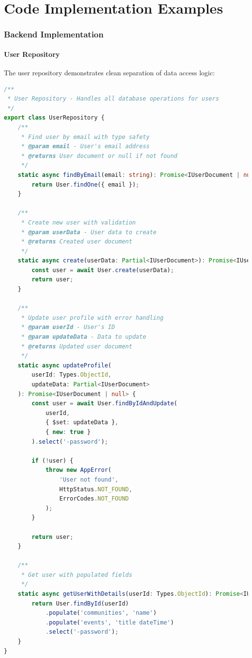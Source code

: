 \section{Code Implementation Examples}
\label{subsec:code_examples}

\subsubsection{Backend Implementation}
\label{subsubsec:backend_examples}

\paragraph{User Repository}
The user repository demonstrates clean separation of data access logic:

\begin{lstlisting}[language=TypeScript, caption={User Repository Implementation}]
/**
 * User Repository - Handles all database operations for users
 */
export class UserRepository {
    /**
     * Find user by email with type safety
     * @param email - User's email address
     * @returns User document or null if not found
     */
    static async findByEmail(email: string): Promise<IUserDocument | null> {
        return User.findOne({ email });
    }

    /**
     * Create new user with validation
     * @param userData - User data to create
     * @returns Created user document
     */
    static async create(userData: Partial<IUserDocument>): Promise<IUserDocument> {
        const user = await User.create(userData);
        return user;
    }

    /**
     * Update user profile with error handling
     * @param userId - User's ID
     * @param updateData - Data to update
     * @returns Updated user document
     */
    static async updateProfile(
        userId: Types.ObjectId,
        updateData: Partial<IUserDocument>
    ): Promise<IUserDocument | null> {
        const user = await User.findByIdAndUpdate(
            userId,
            { $set: updateData },
            { new: true }
        ).select('-password');
        
        if (!user) {
            throw new AppError(
                'User not found',
                HttpStatus.NOT_FOUND,
                ErrorCodes.NOT_FOUND
            );
        }
        
        return user;
    }

    /**
     * Get user with populated fields
     */
    static async getUserWithDetails(userId: Types.ObjectId): Promise<IUserDocument | null> {
        return User.findById(userId)
            .populate('communities', 'name')
            .populate('events', 'title dateTime')
            .select('-password');
    }
}
\end{lstlisting}

